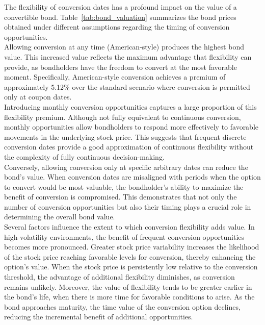 The flexibility of conversion dates has a profound impact on the value of a convertible bond. Table~\ref{tab:bond_valuation} summarizes the bond prices obtained under different assumptions regarding the timing of conversion opportunities.\\

Allowing conversion at any time (American-style) produces the highest bond value. This increased value reflects the maximum advantage that flexibility can provide, as bondholders have the freedom to convert at the most favorable moment. Specifically, American-style conversion achieves a premium of approximately 5.12\% over the standard scenario where conversion is permitted only at coupon dates.\\

Introducing monthly conversion opportunities captures a large proportion of this flexibility premium. Although not fully equivalent to continuous conversion, monthly opportunities allow bondholders to respond more effectively to favorable movements in the underlying stock price. This suggests that frequent discrete conversion dates provide a good approximation of continuous flexibility without the complexity of fully continuous decision-making.\\

Conversely, allowing conversion only at specific arbitrary dates can reduce the bond’s value. When conversion dates are misaligned with periods when the option to convert would be most valuable, the bondholder's ability to maximize the benefit of conversion is compromised. This demonstrates that not only the number of conversion opportunities but also their timing plays a crucial role in determining the overall bond value.\\

Several factors influence the extent to which conversion flexibility adds value. In high-volatility environments, the benefit of frequent conversion opportunities becomes more pronounced. Greater stock price variability increases the likelihood of the stock price reaching favorable levels for conversion, thereby enhancing the option’s value. When the stock price is persistently low relative to the conversion threshold, the advantage of additional flexibility diminishes, as conversion remains unlikely. Moreover, the value of flexibility tends to be greater earlier in the bond's life, when there is more time for favorable conditions to arise. As the bond approaches maturity, the time value of the conversion option declines, reducing the incremental benefit of additional opportunities.\\

